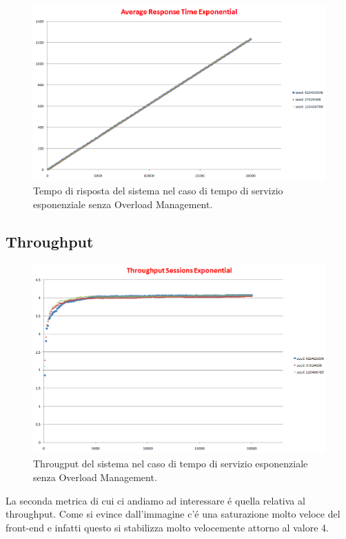 \begin{figure}[H]
	\begin{center}
	\includegraphics[scale=0.4]{img/exp_res_time.png}
	\caption[Tempo di risposta del sistema senza Overload Management (Legge Front-End:Esponenziale)]{Tempo di risposta del sistema nel caso di tempo di servizio esponenziale senza Overload Management.}
	\label{fig:exp_res_time}
	\end{center}
\end{figure}

\subsection{Throughput}
\begin{figure}[H]
	\begin{center}
	\includegraphics[scale=0.4]{img/exp_t_sess.png}
	\caption[Throughput del sistema senza Overload Management (Legge Front-End:Esponenziale)]{Througput del sistema nel caso di tempo di servizio esponenziale senza Overload Management.}
	\label{fig:exp_t_sess}
	\end{center}
\end{figure}
La seconda metrica di cui ci andiamo ad interessare \'e quella relativa al throughput. Come si evince dall'immagine c'\'e una saturazione molto veloce del front-end e infatti questo si stabilizza molto velocemente attorno al valore 4.


